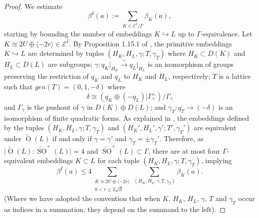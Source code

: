 \documentclass[12pt, a4paper]{article}
\newcommand{\la}{\langle}
\newcommand{\ra}{\rangle}
\newcommand{\ec}{\mathcal{E}}
\newcommand{\opn}{\operatorname}
\newcommand{\op}{\oplus}
\begin{document}
\begin{proof}
    We estimate
    \[
    \beta^I(a)
    :=
    \sum_{K \in \ec^I/\Gamma} \beta_K(a),
    \]
    starting by bounding the number of embeddings $K \hookrightarrow L$ up to $\Gamma$-equivalence. 
    Let $K \cong 2U \op \la -2r \ra \in \ec^I$.    
    By Proposition 1.15.1 of \cite{Nikulin}, the primitive embeddings $K \hookrightarrow L$ are determined by tuples $(H_K, H_L, \gamma; T, \gamma_T)$ where
    $H_K \subset D(K)$ and
    $H_L \subset D(L)$ are subgroups;
    $\gamma:q_K \vert_{H_K} \xrightarrow{\sim} q_L \vert_{H_L}$
    is an isomorphism of groups preserving the restriction of $q_K$ and $q_L$ to $H_K$ and $H_L$, respectively;
    $T$ is a lattice such that $gen(T) = (0,1,-\delta)$ where
    \begin{equation}\label{deltadef}
      \delta \cong (q_K \op (-q_L) \vert \Gamma_{\gamma}^{\perp})/\Gamma_{\gamma} 
    \end{equation}
    and $\Gamma_{\gamma}$ is the pushout of $\gamma$ in $D(K) \op D(L)$;
    and $\gamma_T:q_T \rightarrow (-\delta)$ is an isomorphism of finite quadratic forms.
    As explained in \cite[p.129-130]{Nikulin}, the embeddings defined by the  tuples $(H_K, H_L, \gamma; T, \gamma_T)$ and $(H_K', H_L', \gamma'; T', \gamma_T')$ are equivalent under $\widetilde{\opn{O}}(L)$ if and only if
    $\gamma = \gamma'$ and $\gamma_T = \pm \gamma_T'$.
Therefore, as 
    $\vert \widetilde{\opn{O}}(L):\widetilde{\opn{SO}}^+(L) \vert = 4$
    and $\widetilde{\opn{SO}}^+(L) \subset \Gamma$, there are at most four  $\Gamma$-equivalent embeddings $K \subset L$ for each tuple $(H_K, H_L, \gamma; T, \gamma_T)$, implying 
    \begin{equation}\label{betai1}
      \beta^I(a)
\leq
       4  \sum_{\substack{K \cong 2U \op \la -2r \ra \\ 0<r \leq 2 \sqrt{d}}}
      \sum_{(H_K, H_L, \gamma; T, \gamma_T)} \beta_K(a). 
    \end{equation}
    (Where we have adopted the convention that when $K$, $H_K$, $H_L$, $\gamma$, $T$ and $\gamma_T$ occur as indices in a summation, they depend on the summand to the left).


\end{proof}
\end{document}

